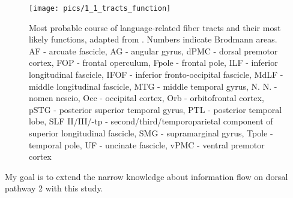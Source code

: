 \begin{figure}[h]
\begin{center}
\vspace{7mm}
\texttt{[image: pics/1\_1\_tracts\_function]}
\caption{\label{1.1.neuron.illustrated} Most probable course of language-related fiber tracts and their most likely functions, adapted from \protect\cite{1.1.Gierhan}. Numbers indicate Brodmann areas. AF - arcuate fascicle, AG - angular gyrus, dPMC - dorsal premotor cortex, FOP - frontal operculum, Fpole - frontal pole, ILF - inferior longitudinal fascicle, IFOF - inferior fronto-occipital fascicle, MdLF - middle longitudinal fascicle, MTG - middle temporal gyrus, N. N. - nomen nescio, Occ - occipital cortex, Orb - orbitofrontal cortex, pSTG - posterior superior temporal gyrus, PTL - posterior temporal lobe, SLF II/III/-tp - second/third/temporoparietal component of superior longitudinal fascicle, SMG - supramarginal gyrus, Tpole - temporal pole, UF - uncinate fascicle, vPMC - ventral premotor cortex}
\end{center}
\end{figure}

My goal is to extend the narrow knowledge about information flow on dorsal pathway 2 with this study.